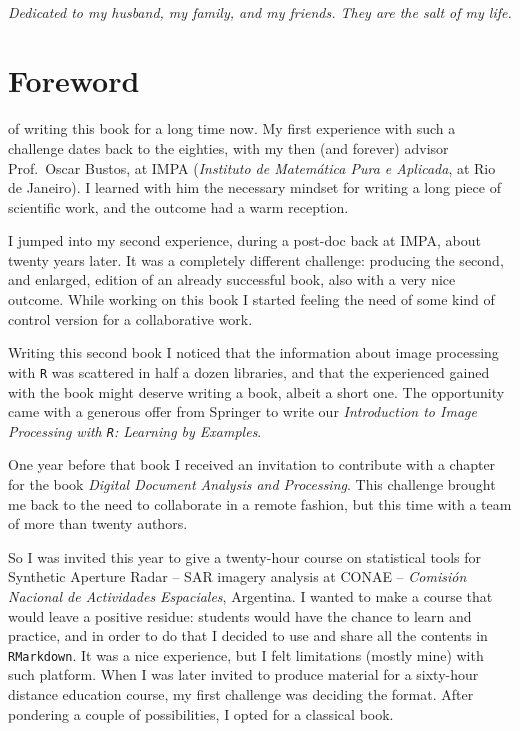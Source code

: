 \documentclass[a4paper]{tufte-book} %
\begin{document}
\cleardoublepage
~\vfill
\begin{doublespace}
\noindent\fontsize{18}{22}\selectfont\itshape
\nohyphenation
Dedicated to my husband, my family, and my friends. They are the salt of my life.
\end{doublespace}
\vfill
\vfill


\cleardoublepage
\chapter*{Foreword} %

 of writing this book for a long time now.
My first experience with such a challenge dates back to the eighties, with my then (and forever) advisor Prof.\ Oscar Bustos, at IMPA (\textit{Instituto de Matem\'atica Pura e Aplicada}, at Rio de Janeiro).
I learned with him the necessary mindset for writing a long piece of scientific work, and the outcome had a warm reception\cite{BustosFrery:92:ABE}.

I jumped into my second experience, during a post-doc back at IMPA, about twenty years later.
It was a completely different challenge: producing the second, and enlarged, edition of an already successful book, also with a very nice outcome\cite{IPVG:2008}.
While working on this book I started feeling the need of some kind of control version for a collaborative work.

Writing this second book I noticed that the information about image processing with \texttt R\cite{Rmanual} was scattered in half a dozen libraries, and that the experienced gained with the book might deserve writing a book, albeit a short one.
The opportunity came with a generous offer from Springer to write our \textit{Introduction to Image Processing with \texttt R: Learning by Examples}\cite{IntroImageProcessingR}.

One year before that book I received an invitation to contribute with a chapter for the book \textit{Digital Document Analysis and Processing}\cite{DigitalDocumentAnalysisProcessing}.
This challenge brought me back to the need to collaborate in a remote fashion, but this time with a team of more than twenty authors.

So I was invited this year to give a twenty-hour course on statistical tools for Synthetic Aperture Radar -- SAR imagery analysis at CONAE -- \textit{Comisi\'on Nacional de Actividades Espaciales}, Argentina.
I wanted to make a course that would leave a positive residue:
students would have the chance to learn and practice, and in order to do that I decided to use and share all the contents in \texttt{RMarkdown}.
It was a nice experience, but I felt limitations (mostly mine) with such platform.
When I was later invited to produce material for a sixty-hour distance education course, my first challenge was deciding the format.
After pondering a couple of possibilities, I opted for a classical book.
\end{document}
